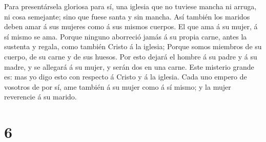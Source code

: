  Para presentársela gloriosa para sí, una iglesia que no
tuviese mancha ni arruga, ni cosa semejante; sino que fuese santa y sin
mancha.  Así también los maridos deben amar á sus mujeres
como á sus mismos cuerpos. El que ama á su mujer, á sí mismo se ama.
 Porque ninguno aborreció jamás á su propia carne, antes la
sustenta y regala, como también Cristo á la iglesia; 
Porque somos miembros de su cuerpo, de su carne y de sus huesos.
 Por esto dejará el hombre á su padre y á su madre, y se
allegará á su mujer, y serán dos en una carne.  Este
misterio grande es: mas yo digo esto con respecto á Cristo y á la
iglesia.  Cada uno empero de vosotros de por sí, ame
también á su mujer como á sí mismo; y la mujer reverencie á su marido.

\hypertarget{section-5}{%
\section{6}\label{section-5}}

